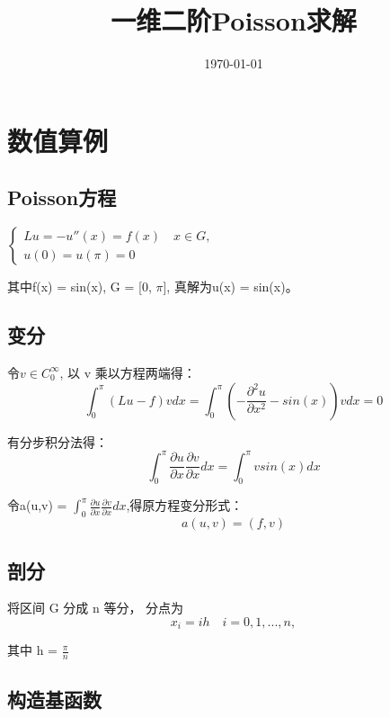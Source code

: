\documentclass[UTF8,titlepage,twocolumn]{ctexart}
\title{一维二阶Poisson求解}
\date{\today}
\begin{document}
\maketitle	

\lstset{language=Python}



\section{数值算例}
\subsection{Poisson方程}
$
\begin{cases}
Lu = -u''(x) = f(x) \quad x \in G, \\
u(0)=u(\pi)=0
\end{cases}
$ \\
\par
其中f(x) = sin(x), G = [0, $\pi$], 真解为u(x) = sin(x)。
\subsection{变分}

令$v \in C_0^\infty $, 以 v 乘以方程两端得：
$$
\int_0^\pi (Lu - f) v dx = \int_0^\pi (- \frac{\partial^2 u}{\partial x^2} - sin(x)) v dx = 0
$$
\par
有分步积分法得：
$$
\int_0^\pi \frac{\partial u}{\partial x} \frac{\partial v}{\partial x} dx = \int_0^\pi v sin(x) dx
$$
\par 
令a(u,v) = $\int_0^\pi \frac{\partial u}{\partial x} \frac{\partial v}{\partial x} dx$,得原方程变分形式：
$$
a(u,v) = (f,v)
$$

\subsection{剖分}

将区间 G 分成 n 等分， 分点为
$$
x_i = ih \quad i = 0,1,...,n,
$$
\par 
其中 h = $\frac{\pi}{n}$ 

\subsection{构造基函数}
\end{document}

